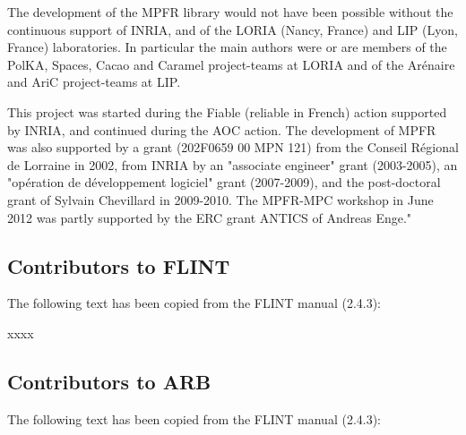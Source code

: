 \vpara
The development of the MPFR library would not have been possible without
the continuous support of INRIA, and of the LORIA (Nancy, France) and LIP
(Lyon, France) laboratories. In particular the main authors were or are
members of the PolKA, Spaces, Cacao and Caramel
project-teams at LORIA and of the
Ar\'enaire and AriC project-teams at LIP.

This project was started during the Fiable (reliable in French) action
supported by INRIA, and continued during the AOC action.
The development of MPFR was also supported by a grant
(202F0659 00 MPN 121) from the Conseil R\'egional de Lorraine in 2002,
from INRIA by an "associate engineer" grant (2003-2005),
an "op\'eration de d\'eveloppement logiciel" grant (2007-2009),
and the post-doctoral grant of Sylvain Chevillard in 2009-2010.
The MPFR-MPC workshop in June 2012 was partly supported by the ERC
grant ANTICS of Andreas Enge."


%
%
%
%
%
%
%



\subsection{Contributors to FLINT}
\label{Contributors to FLINT}
The following text has been copied from the FLINT manual (2.4.3):

\vpara
xxxx


\subsection{Contributors to ARB}
\label{Contributors to ARB}
The following text has been copied from the FLINT manual (2.4.3):


